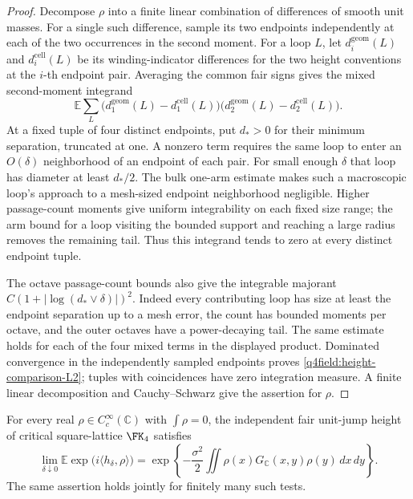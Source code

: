 \begin{proof}
Decompose $\rho$ into a finite linear combination of differences of
smooth unit masses.  For a single such difference, sample its two
endpoints independently at each of the two occurrences in the second
moment.  For a loop $L$, let $d_i^{\mathrm{geom}}(L)$ and
$d_i^{\mathrm{cell}}(L)$ be its winding-indicator differences for
the two height conventions at the $i$-th endpoint pair.  Averaging
the common fair signs gives the mixed second-moment integrand
\[
 \mathbb E\sum_L
   \bigl(d_1^{\mathrm{geom}}(L)-d_1^{\mathrm{cell}}(L)\bigr)
   \bigl(d_2^{\mathrm{geom}}(L)-d_2^{\mathrm{cell}}(L)\bigr).
\]
At a fixed tuple of four distinct endpoints, put $d_*>0$ for their
minimum separation, truncated at one.  A nonzero term requires the
same loop to enter an $O(\delta)$ neighborhood of an endpoint of
each pair.  For small enough $\delta$ that loop has diameter at
least $d_*/2$.  The bulk one-arm estimate makes such a macroscopic
loop's approach to a mesh-sized endpoint neighborhood negligible.
Higher passage-count moments give uniform integrability on each
fixed size range; the arm bound for a loop visiting the bounded
support and reaching a large radius removes the remaining tail.
Thus this integrand tends to zero at every distinct endpoint tuple.

The octave passage-count bounds also give the integrable majorant
$C(1+|\log(d_*\vee\delta)|)^2$.  Indeed every contributing loop has
size at least the endpoint separation up to a mesh error, the count
has bounded moments per octave, and the outer octaves have a
power-decaying tail.  The same estimate holds for each of the four
mixed terms in the displayed product.  Dominated convergence in
the independently sampled endpoints proves
\eqref{q4field:height-comparison-L2}; tuples with coincidences have
zero integration measure.  A finite linear decomposition and
Cauchy--Schwarz give the assertion for $\rho$.
\end{proof}

\begin{proposition}\label{q4field:wholeplane-input}
For every real $\rho\in C_c^\infty(\mathbb C)$ with $\int\rho=0$,
the independent fair unit-jump height of critical square-lattice
$\FK_4$ satisfies
\begin{equation}\label{q4field:plane-characteristic}
 \lim_{\delta\downarrow0}
 \mathbb E\exp\bigl(i\langle h_\delta,\rho\rangle\bigr)
 =\exp\left\{-\frac{\sigma^2}{2}
  \iint\rho(x)G_{\mathbb C}(x,y)\rho(y)\,dx\,dy\right\}.
\end{equation}
The same assertion holds jointly for finitely many such tests.
\end{proposition}

